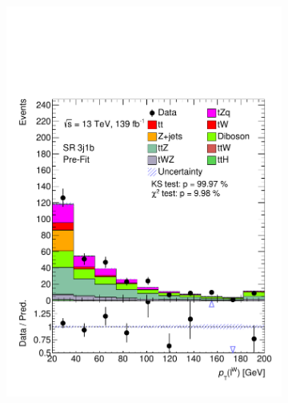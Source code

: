 \begin{figure}[!h]
\begin{subfigure}[b]{0.33\linewidth}
    \includegraphics[width=\linewidth]{ubonn-thesis/Chapters/Chapters_06/Figure/Input_distribution/SR_3j1b_lepW_pt.pdf} 
  \end{subfigure}%
  \begin{subfigure}[b]{0.33\linewidth}
    \centering

\end{subfigure}
\end{figure}
